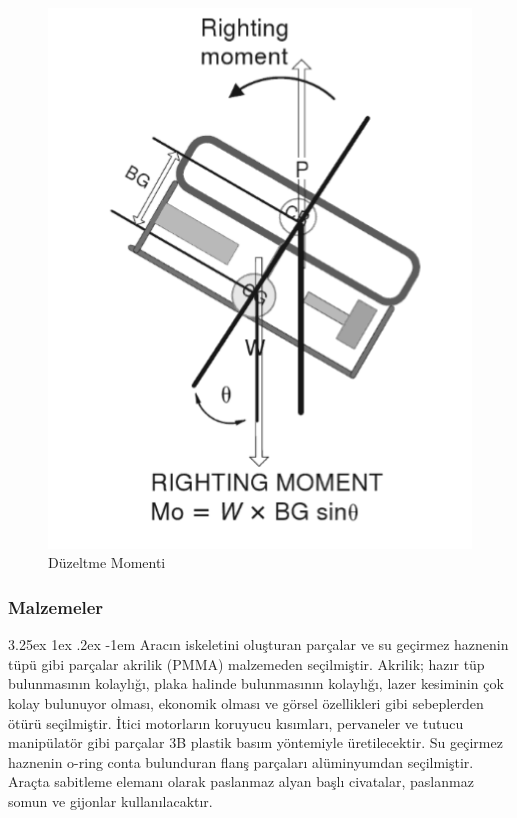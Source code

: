\documentclass[12pt]{article}
\makeatletter
\renewcommand\paragraph{\@startsection{paragraph}{5}{\z@}%
  {3.25ex \@plus1ex \@minus.2ex}%
  {-1em}%
  {\normalfont\normalsize\bfseries}}
\makeatother
\begin{document}
\begin{figure}[hbt!]
\centering
 \begin{adjustbox}{width=7cm}
\includegraphics[width=1\textwidth]{moment.png}
 \end{adjustbox}
\caption{Düzeltme Momenti}
\label{fig:moment}
\end{figure}

\subsubsection{Malzemeler}

\paragraph{} Aracın iskeletini oluşturan parçalar ve su geçirmez haznenin tüpü gibi parçalar akrilik (PMMA) malzemeden seçilmiştir. Akrilik; hazır tüp bulunmasının kolaylığı, plaka halinde bulunmasının kolaylığı, lazer kesiminin çok kolay bulunuyor olması, ekonomik olması ve görsel özellikleri gibi sebeplerden ötürü seçilmiştir. İtici motorların koruyucu kısımları, pervaneler ve tutucu manipülatör gibi parçalar 3B plastik basım yöntemiyle üretilecektir. Su geçirmez haznenin o-ring conta bulunduran flanş parçaları alüminyumdan seçilmiştir. Araçta sabitleme elemanı olarak paslanmaz alyan başlı civatalar, paslanmaz somun ve gijonlar kullanılacaktır.
\end{document}

